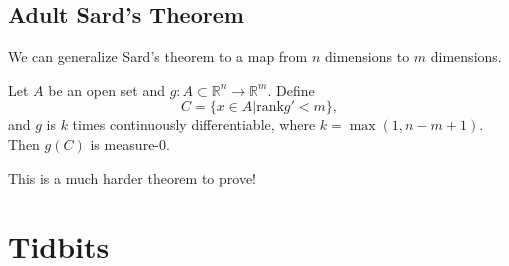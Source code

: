 \documentclass{article}
\numberwithin{equation}{section}
\begin{document}
\subsection{Adult Sard's Theorem}
We can generalize Sard's theorem to a map from $n$ dimensions to $m$ dimensions.
\begin{theorem}
    Let $A$ be an open set and $g:A\subset\mathbb{R}^n \rightarrow \mathbb{R}^m.$ Define 
    \begin{equation}
        C = \{x\in A| \text{rank}g' < m\},
    \end{equation}
    and $g$ is $k$ times continuously differentiable, where $k=\max(1,n-m+1).$ Then $g(C)$ is measure-0. 
\end{theorem}
This is a much harder theorem to prove!
\section{Tidbits}
\end{document}
